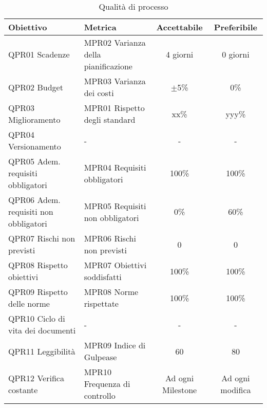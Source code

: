 \documentclass[../piano_di_qualifica.tex]{subfiles}
\begin{document}
\begin{table}[!ht]
	\centering
	\begin{tabular}{|l|l|c|c|}
		\hline
		\rowcolor{lightgray}
		\textbf{Obiettivo}                          & \textbf{Metrica}                & \textbf{Accettabile} & \textbf{Preferibile} \\
		\hline
		QPR01 Scadenze                              & MPR02 Varianza della pianificazione  & 4 giorni                 & 0 giorni               \\
		\hline
		QPR02 Budget                                & MPR03 Varianza dei costi   &     $\pm$5\%            & 0\%                \\
		\hline
		QPR03 Miglioramento                         & MPR01 Rispetto degli standard   & xx\%                 & yyy\%                \\
		\hline
		QPR04 Versionamento                         & -   & -                & -                \\
		\hline
		QPR05 Adem. requisiti obbligatori     & MPR04 Requisiti obbligatori     & 100\%                 & 100\%                \\
		\hline
		QPR06 Adem. requisiti non obbligatori & MPR05 Requisiti non obbligatori & 0\%                 & 60\%                \\
		\hline
		QPR07 Rischi non previsti                   & MPR06 Rischi non previsti       & 0                 & 0                \\
		\hline
		QPR08 Rispetto obiettivi                    & MPR07 Obiettivi soddisfatti     & 100\%                 & 100\%                \\
		\hline
		QPR09 Rispetto delle norme                  & MPR08 Norme rispettate          & 100\%                & 100\%                \\
		\hline
		QPR10 Ciclo di vita dei documenti           & -   & -                 & -                \\
		\hline
		QPR11 Leggibilità                           & MPR09 Indice di Gulpease        & 60                   & 80                   \\
		\hline
		QPR12 Verifica costante                     & MPR10 Frequenza di controllo    & Ad ogni Milestone    & Ad ogni modifica     \\
		\hline
	\end{tabular}
	\caption{Qualità di processo}
\end{table}
\end{document}
